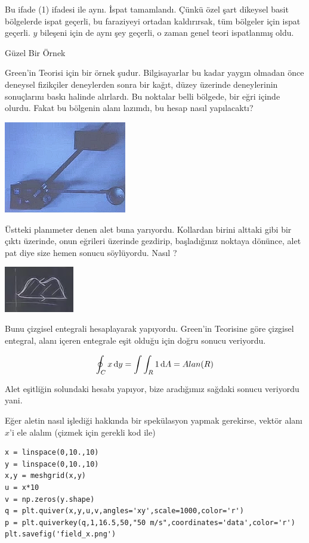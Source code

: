 \documentclass[12pt,fleqn]{article}\usepackage{../../common}
\begin{document}
Bu ifade (1) ifadesi ile aynı. İspat tamamlandı. Çünkü özel şart dikeysel
basit bölgelerde ispat geçerli, bu faraziyeyi ortadan kaldırırsak, tüm
bölgeler için ispat geçerli. $y$ bileşeni için de aynı şey geçerli, o zaman
genel teori ispatlanmış oldu.

Güzel Bir Örnek 

Green'in Teorisi için bir örnek şudur. Bilgisayarlar bu kadar yaygın olmadan
önce deneysel fizikçiler deneylerden sonra bir kağıt, düzey üzerinde
deneylerinin sonuçlarını baskı halinde alırlardı. Bu noktalar belli
bölgede, bir eğri içinde olurdu. Fakat bu bölgenin alanı lazımdı, bu hesap
nasıl yapılacaktı?

\includegraphics[height=4cm]{22_9.png}

Üstteki planımeter denen alet buna yarıyordu. Kollardan birini alttaki gibi
bir çıktı üzerinde, onun eğrileri üzerinde gezdirip, başladığınız noktaya
dönünce, alet pat diye size hemen sonucu söylüyordu. Nasıl ?

\includegraphics[height=2cm]{22_10.png}

Bunu çizgisel entegrali hesaplayarak yapıyordu. Green'in Teorisine göre
çizgisel entegral, alanı içeren entegrale eşit olduğu için doğru sonucu
veriyordu.

$$ \oint_C x \,\mathrm{d} y  = \int \int_R 1 \,\mathrm{d} A = Alan(R) $$

Alet eşitliğin solundaki hesabı yapıyor, bize aradığımız sağdaki sonucu
veriyordu yani. 

Eğer aletin nasıl işlediği hakkında bir spekülasyon yapmak gerekirse,
vektör alanı $x$'i ele alalım (çizmek için gerekli kod ile)

\begin{verbatim}
x = linspace(0,10.,10)
y = linspace(0,10.,10)
x,y = meshgrid(x,y)
u = x*10
v = np.zeros(y.shape)
q = plt.quiver(x,y,u,v,angles='xy',scale=1000,color='r')
p = plt.quiverkey(q,1,16.5,50,"50 m/s",coordinates='data',color='r')
plt.savefig('field_x.png')
\end{verbatim}
\end{document}
